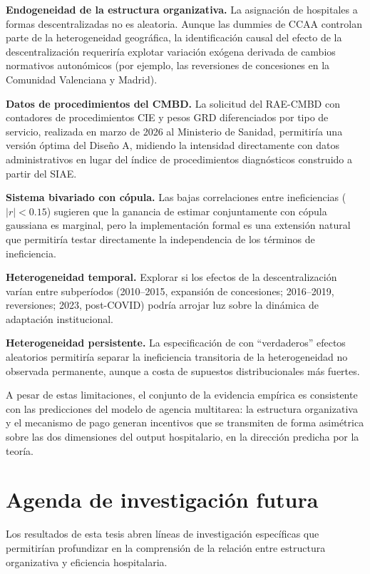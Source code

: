 \documentclass[12pt, a4paper, twoside, openright]{book}
\theoremstyle{plain}
\theoremstyle{definition}
\theoremstyle{remark}
\begin{document}
\textbf{Endogeneidad de la estructura organizativa.} La asignación de hospitales a formas descentralizadas no es aleatoria. Aunque las dummies de CCAA controlan parte de la heterogeneidad geográfica, la identificación causal del efecto de la descentralización requeriría explotar variación exógena derivada de cambios normativos autonómicos (por ejemplo, las reversiones de concesiones en la Comunidad Valenciana y Madrid).

\textbf{Datos de procedimientos del CMBD.} La solicitud del RAE-CMBD con contadores de procedimientos CIE y pesos GRD diferenciados por tipo de servicio, realizada en marzo de 2026 al Ministerio de Sanidad, permitiría una versión óptima del Diseño A, midiendo la intensidad directamente con datos administrativos en lugar del índice de procedimientos diagnósticos construido a partir del SIAE.

\textbf{Sistema bivariado con cópula.} Las bajas correlaciones entre ineficiencias ($|r|<0.15$) sugieren que la ganancia de estimar conjuntamente con cópula gaussiana \citep{kumbhakar1997} es marginal, pero la implementación formal es una extensión natural que permitiría testar directamente la independencia de los términos de ineficiencia.

\textbf{Heterogeneidad temporal.} Explorar si los efectos de la descentralización varían entre subperíodos (2010--2015, expansión de concesiones; 2016--2019, reversiones; 2023, post-COVID) podría arrojar luz sobre la dinámica de adaptación institucional.

\textbf{Heterogeneidad persistente.} La especificación de \citet{greene2005a} con ``verdaderos'' efectos aleatorios permitiría separar la ineficiencia transitoria de la heterogeneidad no observada permanente, aunque a costa de supuestos distribucionales más fuertes.

A pesar de estas limitaciones, el conjunto de la evidencia empírica es consistente con las predicciones del modelo de agencia multitarea: la estructura organizativa y el mecanismo de pago generan incentivos que se transmiten de forma asimétrica sobre las dos dimensiones del output hospitalario, en la dirección predicha por la teoría.

\section{Agenda de investigación futura}
\label{sec:agenda_futura}

Los resultados de esta tesis abren líneas de investigación específicas que permitirían profundizar en la comprensión de la relación entre estructura organizativa y eficiencia hospitalaria.
\end{document}
